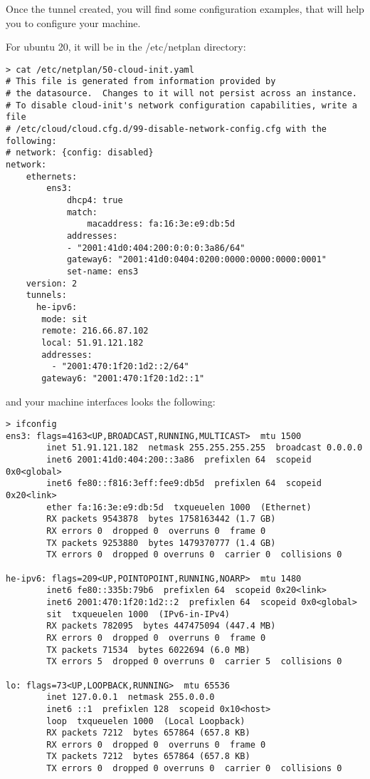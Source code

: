 \documentclass[onecolumn,12pt]{book}
\newcounter{c}
\begin{document}
Once the tunnel created, you will find some configuration examples, that will help you to configure your machine.

For ubuntu 20, it will be in the /etc/netplan directory:

\begin{lstlisting}
> cat /etc/netplan/50-cloud-init.yaml
# This file is generated from information provided by
# the datasource.  Changes to it will not persist across an instance.
# To disable cloud-init's network configuration capabilities, write a file
# /etc/cloud/cloud.cfg.d/99-disable-network-config.cfg with the following:
# network: {config: disabled}
network:
    ethernets:
        ens3:
            dhcp4: true
            match:
                macaddress: fa:16:3e:e9:db:5d
            addresses:
            - "2001:41d0:404:200:0:0:0:3a86/64"
            gateway6: "2001:41d0:0404:0200:0000:0000:0000:0001"
            set-name: ens3
    version: 2
    tunnels:
      he-ipv6:
       mode: sit
       remote: 216.66.87.102
       local: 51.91.121.182
       addresses:
         - "2001:470:1f20:1d2::2/64"
       gateway6: "2001:470:1f20:1d2::1"
\end{lstlisting}

and your machine interfaces looks the following:

\begin{lstlisting}
> ifconfig
ens3: flags=4163<UP,BROADCAST,RUNNING,MULTICAST>  mtu 1500
        inet 51.91.121.182  netmask 255.255.255.255  broadcast 0.0.0.0
        inet6 2001:41d0:404:200::3a86  prefixlen 64  scopeid 0x0<global>
        inet6 fe80::f816:3eff:fee9:db5d  prefixlen 64  scopeid 0x20<link>
        ether fa:16:3e:e9:db:5d  txqueuelen 1000  (Ethernet)
        RX packets 9543878  bytes 1758163442 (1.7 GB)
        RX errors 0  dropped 0  overruns 0  frame 0
        TX packets 9253880  bytes 1479370777 (1.4 GB)
        TX errors 0  dropped 0 overruns 0  carrier 0  collisions 0

he-ipv6: flags=209<UP,POINTOPOINT,RUNNING,NOARP>  mtu 1480
        inet6 fe80::335b:79b6  prefixlen 64  scopeid 0x20<link>
        inet6 2001:470:1f20:1d2::2  prefixlen 64  scopeid 0x0<global>
        sit  txqueuelen 1000  (IPv6-in-IPv4)
        RX packets 782095  bytes 447475094 (447.4 MB)
        RX errors 0  dropped 0  overruns 0  frame 0
        TX packets 71534  bytes 6022694 (6.0 MB)
        TX errors 5  dropped 0 overruns 0  carrier 5  collisions 0

lo: flags=73<UP,LOOPBACK,RUNNING>  mtu 65536
        inet 127.0.0.1  netmask 255.0.0.0
        inet6 ::1  prefixlen 128  scopeid 0x10<host>
        loop  txqueuelen 1000  (Local Loopback)
        RX packets 7212  bytes 657864 (657.8 KB)
        RX errors 0  dropped 0  overruns 0  frame 0
        TX packets 7212  bytes 657864 (657.8 KB)
        TX errors 0  dropped 0 overruns 0  carrier 0  collisions 0
\end{lstlisting}
\end{document}
